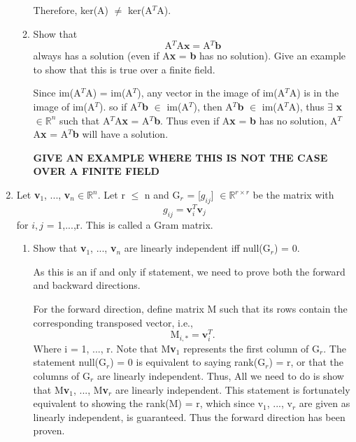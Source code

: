 \documentclass[12pt]{article}
\newcommand{\hop}{\vspace{1mm}}
\newcommand{\jump}{\vspace{5mm}}
\newcommand{\R}{\mathbb{R}}
\begin{document}
\begin{enumerate}[leftmargin=\labelsep]
\begin{enumerate}
Therefore, ker(A) $\neq$ ker(A$^T$A).

\jump
\item Show that
\[
\text{A$^T$A}\textbf{x} = \text{A$^T$}\textbf{b}
\]
always has a solution (even if A\textbf{x} = \textbf{b} has no solution). Give an example to show that this is true over a finite field.  

\hop
Since im(A$^T$A) = im(A$^T$), any vector in the image of im(A$^T$A) is in the image of im(A$^T$). so if A$^T$\textbf{b} $\in$ im(A$^T$), then A$^T$\textbf{b} $\in$ im(A$^T$A), thus $\exists$ \textbf{x} $\in \R^{n}$ such that A$^T$A\textbf{x} = A$^T$\textbf{b}. Thus even if A\textbf{x} = \textbf{b} has no solution, A$^T$A\textbf{x} = A$^T$\textbf{b} will have a solution. 

\textbf{GIVE AN EXAMPLE WHERE THIS IS NOT THE CASE OVER A FINITE FIELD}
\end{enumerate}
\jump
\item Let \textbf{v}$_1$, ..., \textbf{v}$_n \in \R^n$. Let r $\leq$ n and G$_r$ = [$g_{ij}$] $\in \R^{r \times r}$ be the matrix with
\[
g_{ij} = \textbf{v}_{i}^{T}\textbf{v}_{j}
\]
for $i, j$ = 1,...,r. This is called a Gram matrix. 
\begin{enumerate}
    \item Show that \textbf{v}$_1$, ..., \textbf{v}$_n$ are linearly independent iff null(G$_r$) = 0. 
    
    \hop
    As this is an if and only if statement, we need to prove both the forward and backward directions. 
    
    For the forward direction, define matrix M such that its rows contain the corresponding transposed vector, i.e., 
    \[
    \text{M}_{i,*} = \textbf{v}_i^T.
    \]
    Where i = 1, ..., r. Note that M\textbf{v}$_1$ represents the first column of G$_r$. The statement null(G$_r$) = 0 is equivalent to saying rank(G$_r$) = r, or that the columns of G$_r$ are linearly independent. Thus, All we need to do is show that M\textbf{v}$_1$, ..., M\textbf{v}$_r$ are linearly independent. This statement is fortunately equivalent to showing the rank(M) = r, which since {v}$_1$, ..., {v}$_r$ are given as linearly independent, is guaranteed.
    Thus the forward direction has been proven.


\end{enumerate}
\end{enumerate}
\end{document}
